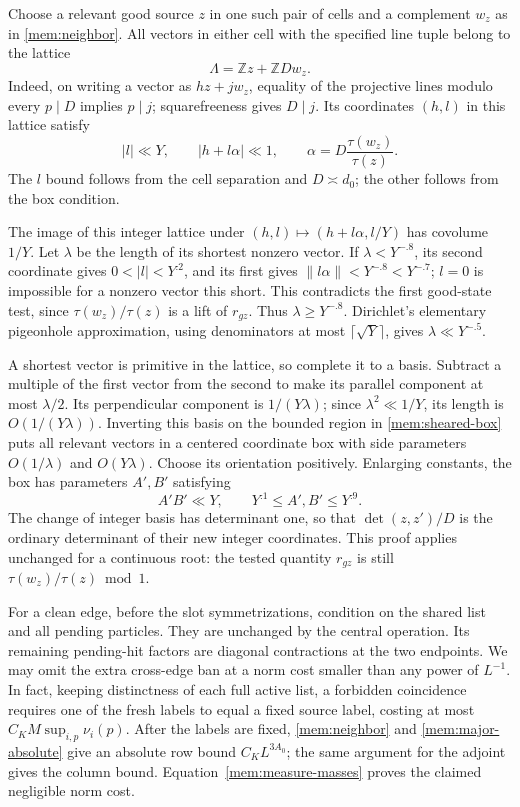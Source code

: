 Choose a relevant good source $z$ in one such pair of cells and a
complement $w_z$ as in \eqref{mem:neighbor}. All vectors in either cell
with the specified line tuple belong to the lattice
\[
 \Lambda=\mathbb Z z+\mathbb Z D w_z.
\]
Indeed, on writing a vector as $h z+jw_z$, equality of the projective
lines modulo every $p\mid D$ implies $p\mid j$; squarefreeness gives
$D\mid j$. Its coordinates $(h,l)$ in this lattice satisfy
\begin{equation}\label{mem:sheared-box}
 |l|\ll Y,\qquad |h+l\alpha|\ll1,
 \qquad \alpha=D\frac{\tau(w_z)}{\tau(z)}.
\end{equation}
The $l$ bound follows from the cell separation and $D\asymp d_0$;
the other follows from the box condition.

The image of this integer lattice under
$(h,l)\mapsto(h+l\alpha,l/Y)$ has covolume $1/Y$.
Let $\lambda$ be the length of its shortest nonzero vector. If
$\lambda<Y^{-.8}$, its second coordinate gives
$0<|l|<Y^{.2}$, and its first gives
$\|l\alpha\|<Y^{-.8}<Y^{-.7}$; $l=0$ is impossible for a nonzero
vector this short. This contradicts the first good-state test, since
$\tau(w_z)/\tau(z)$ is a lift of $r_{gz}$. Thus
$\lambda\ge Y^{-.8}$. Dirichlet's elementary pigeonhole approximation,
using denominators at most $\lceil\sqrt Y\rceil$, gives
$\lambda\ll Y^{-.5}$.

A shortest vector is primitive in the lattice, so complete it to a
basis. Subtract a multiple of the first vector from the second to
make its parallel component at most $\lambda/2$. Its perpendicular
component is $1/(Y\lambda)$; since $\lambda^2\ll1/Y$, its length is
$O(1/(Y\lambda))$. Inverting this basis on the bounded region in
\eqref{mem:sheared-box} puts all relevant vectors in a centered
coordinate box with side parameters $O(1/\lambda)$ and $O(Y\lambda)$.
Choose its orientation positively. Enlarging constants, the box has
parameters $A',B'$ satisfying
\begin{equation}\label{mem:lattice-shape}
 A'B'\ll Y,\qquad Y^{.1}\le A',B'\le Y^{.9}.
\end{equation}
The change of integer basis has determinant one, so that
$\det(z,z')/D$ is the ordinary determinant of their new integer
coordinates. This proof applies unchanged for a continuous root:
the tested quantity $r_{gz}$ is still
$\tau(w_z)/\tau(z)\bmod1$.

For a clean edge, before the slot symmetrizations, condition on the
shared list and all pending particles. They are unchanged by the central
operation. Its remaining
pending-hit factors are diagonal contractions at the two endpoints.
We may omit the extra cross-edge ban at a norm cost smaller than any
power of $L^{-1}$. In fact, keeping distinctness of each full active
list, a forbidden coincidence requires one of the fresh labels to
equal a fixed source label, costing at most
$C_KM\sup_{i,p}\nu_i(p)$. After the labels are fixed,
\eqref{mem:neighbor} and \eqref{mem:major-absolute} give an absolute
row bound $C_K L^{3A_0}$; the same argument for the adjoint gives the
column bound. Equation~\eqref{mem:measure-masses} proves the claimed
negligible norm cost.

